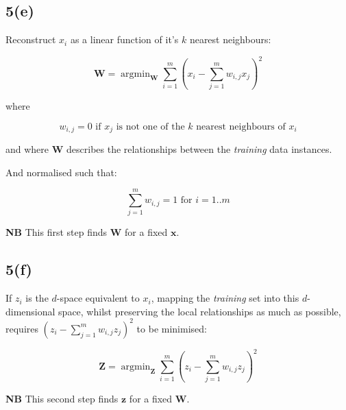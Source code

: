\documentclass[12pt, a4paper,reqno]{article}
\DeclareMathOperator*{\argmin}{argmin}
\begin{document}
\subsection*{5(e)}

Reconstruct $x_i$ as a linear function of it's $k$ nearest neighbours:

\begin{equation}
\mathbf{W} = \argmin_{\mathbf{W}}\sum_{i=1}^{m}\left(x_i - \sum_{j=1}^{m} w_{i, j}x_j\right)^2
\end{equation}

where

\begin{equation}
w_{i,j} = 0\text{ if $x_j$ is not one of the $k$ nearest neighbours of $x_i$}
\end{equation}

and where $\mathbf{W}$ describes the relationships between the \emph{training} data instances.

And normalised such that:

\begin{equation}
\sum_{j=1}^m w_{i, j} = 1\text{ for } i = 1..m
\end{equation}

\textbf{NB} This first step finds $\mathbf{W}$ for a fixed $\mathbf{x}$.

\subsection*{5(f)}

If $z_i$ is the $d$-space equivalent to $x_i$, mapping the \emph{training} set into this $d$-dimensional space, whilst preserving the local relationships as much as possible, requires $\left(z_i - \sum_{j=1}^m w_{i, j} z_j\right)^2$ to be minimised:

\begin{equation}
\mathbf{Z} = \argmin_{\mathbf{Z}}\sum_{i=1}^{m}\left(z_i - \sum_{j=1}^{m} w_{i, j}z_j\right)^2
\end{equation}

\textbf{NB} This second step finds $\mathbf{z}$ for a fixed $\mathbf{W}$.
\end{document}
